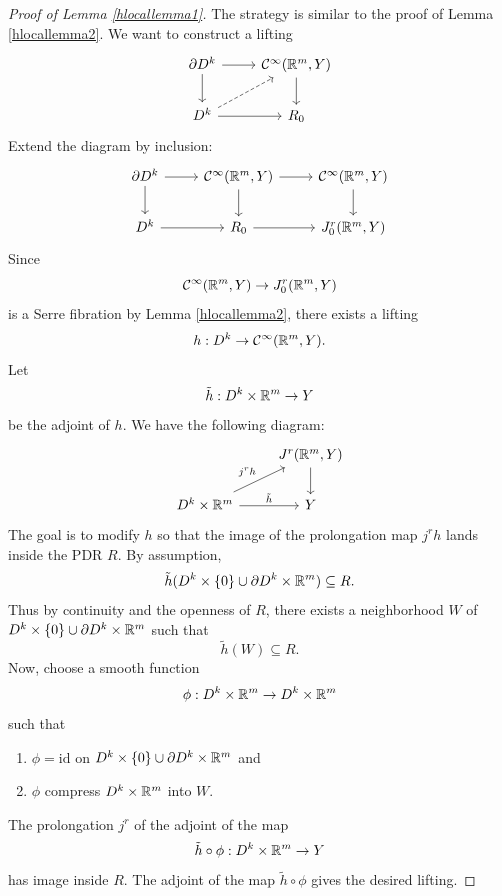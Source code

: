 \documentclass{article}
\newtheorem{proposed work}[theorem]{Proposed Work}
\begin{document}
\begin{proof}[Proof of Lemma \ref{hlocallemma1}]
The strategy is similar to the proof of Lemma \ref{hlocallemma2}. We
want to construct a lifting
\begin{equation*}
\begin{tikzcd}
\partial D^k \ar[d] \ar[r] &\cC^\infty(\R^m,Y) \ar[d] \\
D^k \ar[r] \ar[ur, dashed] & R_0
\end{tikzcd}
\end{equation*}
Extend the diagram by inclusion:
\begin{equation*}
\begin{tikzcd}
\partial D^k \ar[d] \ar[r] & \cC^\infty(\R^m,Y) \ar[d] \ar[r] & \cC^\infty(\R^m,Y) \ar[d] \\
D^k \ar[r] & R_0 \ar[r] & J^r_0(\R^m, Y)
\end{tikzcd}
\end{equation*}
Since
\begin{equation*}
\mathcal C^\infty(\mathbb R^m,Y) \to J^r_0(\mathbb R^m,Y)
\end{equation*}
is a Serre fibration by Lemma \ref{hlocallemma2}, there exists a lifting
\begin{equation*}
h: D^k \to \mathcal C^\infty(\mathbb R^m,Y).
\end{equation*}
Let
\begin{equation*}
\tilde{h}: D^k \times \mathbb R^m \to Y
\end{equation*}
be the adjoint of $h$. We have the following diagram:
\begin{equation*}
\begin{tikzcd}
{} & J^r(\R^m,Y) \ar[d] \\
D^k\times \R^m \ar[ur, "j^rh"] \ar[r, "\tilde{h}"] & Y
\end{tikzcd}
\end{equation*}
The goal is to modify $h$ so that the image of the prolongation map
$j^rh$ lands inside the PDR $R$. By assumption,
\begin{equation*}
\tilde{h}(D^k\times\{0\} \cup \partial D^k \times \mathbb R^m) \subseteq R.
\end{equation*}
Thus by continuity and the openness of $R$, there exists a
neighborhood $W$ of $D^k\times\{0\} \cup \partial D^k \times \mathbb R^m$ such that
\begin{equation*}
\tilde{h}(W) \subseteq R.
\end{equation*}
Now, choose a smooth function
\begin{equation*}
\phi: D^k \times \mathbb R^m \to D^k \times \mathbb R^m
\end{equation*}
such that
\begin{enumerate}
\item $\phi= \mathrm{id}$ on $D^k\times\{0\} \cup \partial D^k \times \mathbb R^m$ and
\item $\phi$ compress $D^k \times \mathbb R^m$ into $W$.
\end{enumerate}
The prolongation $j^r$ of the adjoint of the map
\begin{equation*}
\tilde{h} \circ \phi: D^k \times \mathbb R^m \to Y
\end{equation*}
has image inside $R$. The adjoint of the map $\tilde{h} \circ \phi$
gives the desired lifting.
\end{proof}
\end{document}

